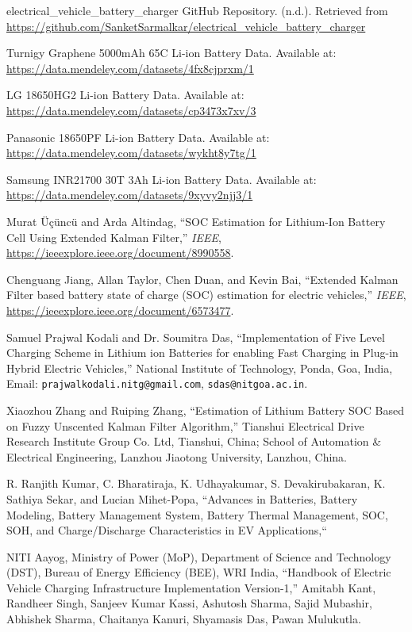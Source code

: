 \documentclass[conference]{IEEEtran}
\begin{document}
\begin{thebibliography}{00}
 electrical\_vehicle\_battery\_charger GitHub Repository. (n.d.). Retrieved from \url{https://github.com/SanketSarmalkar/electrical_vehicle_battery_charger}

 Turnigy Graphene 5000mAh 65C Li-ion Battery Data. Available at: \url{https://data.mendeley.com/datasets/4fx8cjprxm/1}

 LG 18650HG2 Li-ion Battery Data. Available at: \url{https://data.mendeley.com/datasets/cp3473x7xv/3}

 Panasonic 18650PF Li-ion Battery Data. Available at: \url{https://data.mendeley.com/datasets/wykht8y7tg/1}

 Samsung INR21700 30T 3Ah Li-ion Battery Data. Available at: \url{https://data.mendeley.com/datasets/9xyvy2njj3/1}

Murat Üçüncü and Arda Altindag,
``SOC Estimation for Lithium-Ion Battery Cell Using Extended Kalman Filter,''
\emph{IEEE}, 
\url{https://ieeexplore.ieee.org/document/8990558}.

Chenguang Jiang, Allan Taylor, Chen Duan, and Kevin Bai,
``Extended Kalman Filter based battery state of charge (SOC) estimation for electric vehicles,''
\emph{IEEE}, 
\url{https://ieeexplore.ieee.org/document/6573477}.

Samuel Prajwal Kodali and Dr. Soumitra Das,
``Implementation of Five Level Charging Scheme in Lithium ion Batteries for enabling Fast Charging in Plug-in Hybrid Electric Vehicles,''
National Institute of Technology, Ponda, Goa, India, 
Email: \texttt{prajwalkodali.nitg@gmail.com}, \texttt{sdas@nitgoa.ac.in}.


Xiaozhou Zhang and Ruiping Zhang,
``Estimation of Lithium Battery SOC Based on Fuzzy Unscented Kalman Filter Algorithm,''
Tianshui Electrical Drive Research Institute Group Co. Ltd, Tianshui, China; School of Automation \& Electrical Engineering, Lanzhou Jiaotong University, Lanzhou, China.

R. Ranjith Kumar, C. Bharatiraja, K. Udhayakumar, S. Devakirubakaran, K. Sathiya Sekar, and Lucian Mihet-Popa,
``Advances in Batteries, Battery Modeling, Battery Management System, Battery Thermal Management, SOC, SOH, and Charge/Discharge Characteristics in EV Applications,``

NITI Aayog, Ministry of Power (MoP), Department of Science and Technology (DST), Bureau of Energy Efficiency (BEE), WRI India,
``Handbook of Electric Vehicle Charging Infrastructure Implementation Version-1,''
Amitabh Kant, Randheer Singh, Sanjeev Kumar Kassi, Ashutosh Sharma, Sajid Mubashir, Abhishek Sharma, Chaitanya Kanuri, Shyamasis Das, Pawan Mulukutla.


\end{thebibliography}
\end{document}
